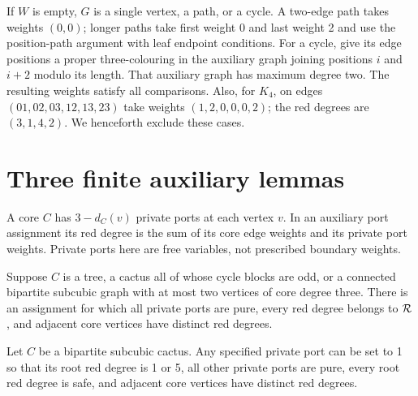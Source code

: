 If $W$ is empty, $G$ is a single vertex, a path, or a cycle.
A two-edge path takes weights $(0,0)$; longer paths take first weight 0
and last weight 2 and use the position-path argument with leaf endpoint
conditions.  For a cycle, give its edge positions a proper three-colouring
in the auxiliary graph joining positions $i$ and $i+2$ modulo its length.
That auxiliary graph has maximum degree two.  The resulting weights
satisfy all comparisons.  Also, for $K_4$, on edges
$(01,02,03,12,13,23)$ take weights $(1,2,0,0,0,2)$; the red degrees are
$(3,1,4,2)$.  We henceforth exclude these cases.

\section{Three finite auxiliary lemmas}\label{sec:finite}

A core $C$ has $3-d_C(v)$ private ports at each vertex $v$.
In an auxiliary port assignment its red degree is the sum of its core
edge weights and its private port weights.  Private ports here are free
variables, not prescribed boundary weights.

\begin{lemma}\label{lem:free}
Suppose $C$ is a tree, a cactus all of whose cycle blocks are odd, or a
connected bipartite subcubic graph with at most two vertices of core
degree three.  There is an assignment for which all private ports are
pure, every red degree belongs to $\mathcal R$, and adjacent core vertices
have distinct red degrees.
\end{lemma}

\begin{lemma}\label{lem:one}
Let $C$ be a bipartite subcubic cactus.  Any specified private port can
be set to 1 so that its root red degree is 1 or 5, all other private
ports are pure, every root red degree is safe, and adjacent core vertices
have distinct red degrees.
\end{lemma}

